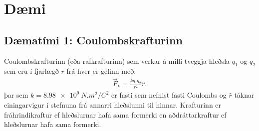 \ifdefined \wholebook \else\documentclass[oneside]{book}\usepackage{EdlBook}\graphicspath{{figures/}}
\begin{document}
\section{Dæmi}

\subsection*{Dæmatími 1: Coulombskrafturinn}

\begin{tcolorbox}
Coulombskrafturinn (eða rafkrafturinn) sem verkar á milli tveggja hleðsla $q_1$ og $q_2$ sem eru í fjarlægð $r$ frá hver er gefinn með:
\begin{align*}
    \vec{F}_k = \frac{kq_1 q_2}{r^2} \hat{r}.
\end{align*}
þar sem $k = \SI{8.98e9}{N.m^2/C^2}$ er fasti sem nefnist fasti Coulombs og $\hat{r}$ táknar einingarvigur í stefnuna frá annarri hleðslunni til hinnar. Krafturinn er fráhrindikraftur ef hleðslurnar hafa sama formerki en aðdráttarkraftur ef hleðslurnar hafa sama formerki.
\end{tcolorbox}
\end{document}
